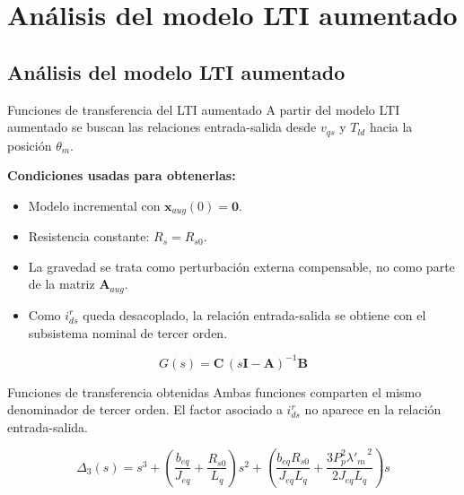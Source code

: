 \documentclass[aspectratio=169,t]{beamer}
\newcommand{\SecPresentacion}{Presentación del problema}
\newcommand{\SecMecanico}{Subsistema mecánico equivalente}
\newcommand{\SecElectromagnetico}{Subsistema electromagnético en coordenadas qd0}
\newcommand{\SecTermico}{Subsistema térmico}
\newcommand{\SecNLGlobal}{Sistema No Lineal Global}
\newcommand{\SecLPV}{Linealización Jacobiana (LPV)}
\newcommand{\SecLTI}{Obtención del modelo LTI equivalente}
\newcommand{\SecAnalisisLTI}{Análisis del modelo LTI aumentado}
\newcommand{\SecDinamica}{Respuesta dinámica en dominio del tiempo}
\newcommand{\SecControlador}{Diseño y análisis del controlador en cascada}
\newcommand{\SecVerifSpecs}{Verificación de desempeño: Especificaciones de operación}
\newcommand{\SecVerifOffset}{Verificación de desempeño: Offset de estado estacionario}
\newcommand{\SecVerifNoIdealidades}{Verificación de desempeño: No idealidades y comportamiento térmico}
\newcommand{\SecDiscretizacion}{Discretización del controlador}
\newcommand{\SecSoftware}{Codificación del software de control}
\newcommand{\AgendaItem}[3]{%
  \ifnum#1=#2
    {\scriptsize\bfseries\color{uncBlue}%
      \hyperlink{sec:#1}{\makebox[2.2em][r]{#1.}\hspace{0.7em}%
      \parbox[t]{0.86\textwidth}{#3}}\par}%
  \else
    {\scriptsize\color{black!26}%
      \hyperlink{sec:#1}{\makebox[2.2em][r]{#1.}\hspace{0.7em}%
      \parbox[t]{0.86\textwidth}{#3}}\par}%
  \fi
  \vspace{0.35mm}%
}
\newcommand{\AgendaBody}[1]{%
    \vspace{3mm}
    {\Large\bfseries\color{uncBlue}Tabla de contenidos\par}
    \vspace{2mm}
    \begin{minipage}{0.94\textwidth}
      \AgendaItem{1}{#1}{\SecPresentacion}
      \AgendaItem{2}{#1}{\SecMecanico}
      \AgendaItem{3}{#1}{\SecElectromagnetico}
      \AgendaItem{4}{#1}{\SecTermico}
      \AgendaItem{5}{#1}\SecNLGlobal
      \AgendaItem{6}{#1}{\SecLPV}
      \AgendaItem{7}{#1}{\SecLTI}
      \AgendaItem{8}{#1}{\SecAnalisisLTI}
      \AgendaItem{9}{#1}{\SecDinamica}
      \AgendaItem{10}{#1}{\SecControlador}
      \AgendaItem{11}{#1}{\SecVerifSpecs}
      \AgendaItem{12}{#1}{\SecVerifOffset}
      \AgendaItem{13}{#1}{\SecVerifNoIdealidades}
      \AgendaItem{14}{#1}{\SecDiscretizacion}
      \AgendaItem{15}{#1}{\SecSoftware}
    \end{minipage}
    \vfill
}
\newcommand{\AgendaSlideTarget}[2]{%
  \begin{frame}[plain]
    \hypertarget{#2}{}%
    \AgendaBody{#1}
  \end{frame}
}
\newcommand{\StartProjectSection}[2]{%
  \section{#2}%
  \subsection{#2}%
  \AgendaSlideTarget{#1}{sec:#1}%
}
\begin{document}
\StartProjectSection{8}{\SecAnalisisLTI}
\begin{frame}{Funciones de transferencia del LTI aumentado}
{\small\color{uncGray}A partir del modelo LTI aumentado se buscan las relaciones entrada-salida desde $v_{qs}$ y $T_{ld}$ hacia la posición $\theta_m$.}\par
\vspace{3mm}

\textbf{Condiciones usadas para obtenerlas:}
\begin{itemize}
  \item Modelo incremental con $\bm{x}_{aug}(0)=\bm{0}$.
  \item Resistencia constante: $R_s=R_{s0}$.
  \item La gravedad se trata como perturbación externa compensable, no como parte de la matriz $\bm{A}_{aug}$.
  \item Como $i_{ds}^{r}$ queda desacoplado, la relación entrada-salida se obtiene con el subsistema nominal de tercer orden.
\end{itemize}

\begin{equation*}
G(s)=\bm{C}\,(s\bm{I}-\bm{A})^{-1}\bm{B}
\end{equation*}
\end{frame}

\begin{frame}{Funciones de transferencia obtenidas}
{\small\color{uncGray}Ambas funciones comparten el mismo denominador de tercer orden. El factor asociado a $i_{ds}^{r}$ no aparece en la relación entrada-salida.}\par
\vspace{2mm}

\small
\begin{equation*}
\Delta_3(s)=
s^3+
\left(\frac{b_{eq}}{J_{eq}}+\frac{R_{s0}}{L_q}\right)s^2+
\left(\frac{b_{eq}R_{s0}}{J_{eq}L_q}+
\frac{3P_p^2{\lambda'_m}^{\,2}}{2J_{eq}L_q}\right)s
\end{equation*}

\vspace{2mm}
\normalsize


\end{frame}
\end{document}
